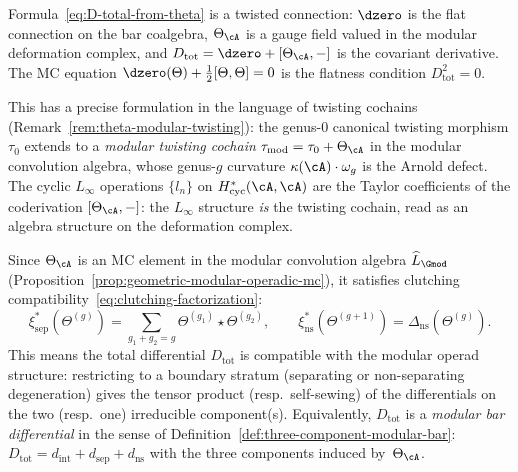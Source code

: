 \begin{remark}
\label{rem:D-tot-as-connection}%
\label{rem:theta-as-curved-twisting}%
Formula~\eqref{eq:D-total-from-theta} is a twisted connection:
$\dzero$ is the flat connection on the bar coalgebra,
$\Theta_\cA$ is a gauge field valued in the modular deformation
complex, and $D_{\mathrm{tot}} = \dzero + [\Theta_\cA, -]$ is
the covariant derivative.
The MC equation
$\dzero(\Theta) + \tfrac{1}{2}[\Theta, \Theta] = 0$
is the flatness condition $D_{\mathrm{tot}}^2 = 0$.

This has a precise formulation in the language of twisting cochains
(Remark~\ref{rem:theta-modular-twisting}):
the genus-$0$ canonical twisting morphism $\tau_0$ extends to a
\emph{modular twisting cochain}
$\tau_{\mathrm{mod}} = \tau_0 + \Theta_\cA$
in the modular convolution algebra, whose genus-$g$ curvature
$\kappa(\cA)\cdot\omega_g$ is the Arnold defect.
The cyclic $L_\infty$ operations $\{l_n\}$ on
$H^*_{\mathrm{cyc}}(\cA,\cA)$ are the Taylor coefficients of the
coderivation $[\Theta_\cA, -]$: the $L_\infty$ structure \emph{is}
the twisting cochain, read as an algebra structure on the
deformation complex.
\end{remark}

\begin{remark}
\label{rem:clutching-D-tot}
Since $\Theta_\cA$ is an MC element in the modular convolution
algebra $\widehat{L}_{\Gmod}$
(Proposition~\ref{prop:geometric-modular-operadic-mc}),
it satisfies clutching
compatibility~\eqref{eq:clutching-factorization}:
\[
\xi_{\mathrm{sep}}^*(\Theta^{(g)})
= \sum_{g_1+g_2=g} \Theta^{(g_1)} \star \Theta^{(g_2)},
\qquad
\xi_{\mathrm{ns}}^*(\Theta^{(g+1)})
= \Delta_{\mathrm{ns}}(\Theta^{(g)}).
\]
This means the total differential $D_{\mathrm{tot}}$ is
compatible with the modular operad structure: restricting to a
boundary stratum (separating or non-separating degeneration) gives
the tensor product (resp.\ self-sewing) of the differentials on the
two (resp.\ one) irreducible component(s).  Equivalently,
$D_{\mathrm{tot}}$ is a \emph{modular bar differential} in the
sense of Definition~\ref{def:three-component-modular-bar}:
$D_{\mathrm{tot}} = d_{\mathrm{int}} + d_{\mathrm{sep}} +
d_{\mathrm{ns}}$ with the three components induced by~$\Theta_\cA$.
\end{remark}

